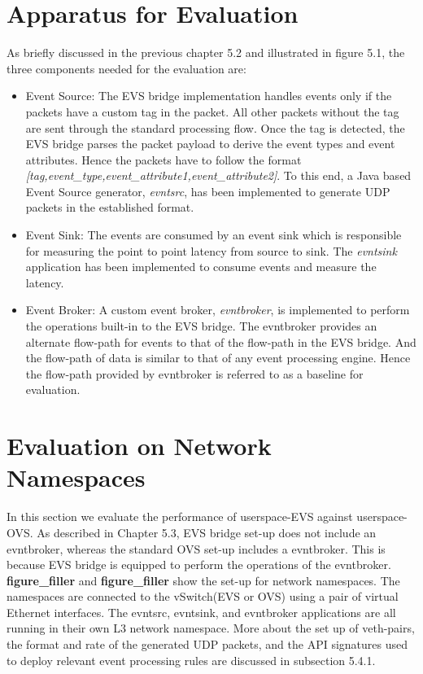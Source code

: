 \section{Apparatus for Evaluation}
As briefly discussed in the previous chapter 5.2 and illustrated in figure 5.1, the three components needed for the evaluation are:
\begin{itemize}
	\item Event Source: The EVS bridge implementation handles events only if the packets have a custom tag in the packet. All other packets without the tag are sent through the standard processing flow. Once the tag is detected, the EVS bridge parses the packet payload to derive the event types and event attributes. Hence the packets have to follow the  format \textit{[tag,event_type,event_attribute1,event_attribute2]}. To this end, a Java based Event Source generator, \textit{evntsrc}, has been implemented to generate UDP packets in the established format.
		
	\item Event Sink: The events are consumed by an event sink which is responsible for measuring the point to point latency from source to sink. The \textit{evntsink} application has been implemented to consume events and measure the latency.
	
	\item Event Broker: A custom event broker, \textit{evntbroker}, is implemented to perform the operations built-in to the EVS bridge. The evntbroker provides an alternate flow-path for events to that of the flow-path in the EVS bridge. And the flow-path of data is similar to that of any event processing engine. Hence the flow-path provided by evntbroker is referred to as a baseline for evaluation.
\end{itemize}

\section{Evaluation on Network Namespaces}
In this section we evaluate the performance of userspace-EVS against userspace-OVS. As described in Chapter 5.3, EVS bridge set-up does not include an evntbroker, whereas the standard OVS set-up includes a evntbroker. This is because EVS bridge is equipped to perform the operations of the evntbroker. \textbf{figure_filler} and \textbf{figure_filler} show the set-up for network namespaces. The namespaces are connected to the vSwitch(EVS or OVS) using a pair of virtual Ethernet interfaces. The evntsrc, evntsink, and evntbroker applications are all running in their own L3 network namespace. More about the set up of veth-pairs, the format and rate of the generated UDP packets, and the API signatures used to deploy relevant event processing rules are discussed in subsection 5.4.1.


